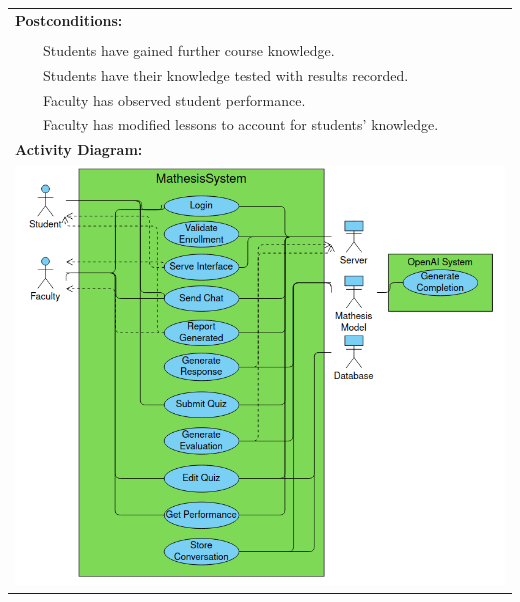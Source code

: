 \documentclass[12pt,a4paper]{article}
\newcommand{\tabitem}{\\~~\llap{\textbullet}~~}
\begin{document}
\begin{appendices}
\begin{table}[H]
\begin{tabular}{|p{13cm}|}
            \textbf{Postconditions:} \\\makecell[l]{
                \tabitem Students have gained further course knowledge.
                \tabitem Students have their knowledge tested with results recorded.
                \tabitem Faculty has observed student performance.
                \tabitem Faculty has modified lessons to account for students' knowledge.
            }\\\hline

            \textbf{Activity Diagram:}\\

            \includegraphics[width=\linewidth]{images/newActivityDiagram}\\\hline


\end{tabular}
\end{table}
\end{appendices}
\end{document}
